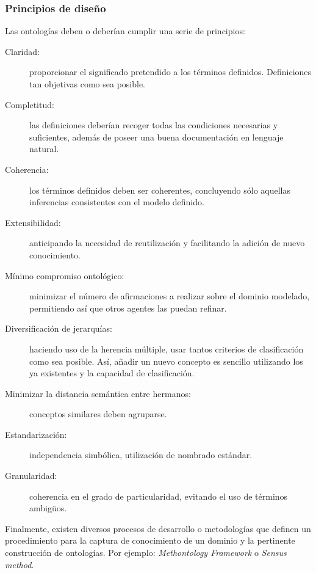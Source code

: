 \subsubsection{Principios de diseño}\label{onto-design}
Las ontologías deben o deberían cumplir una serie de principios:
\begin{description}
\item[Claridad:] proporcionar el significado pretendido a los términos
definidos. Definiciones tan objetivas como sea posible.
\item[Completitud:] las definiciones deberían recoger todas las condiciones
necesarias y suficientes, además de poseer una buena documentación en lenguaje natural.
 \item[Coherencia:] los términos definidos deben ser coherentes, concluyendo
 sólo aquellas inferencias consistentes con el modelo definido.
 \item[Extensibilidad:] anticipando la necesidad de reutilización y facilitando
 la adición de nuevo \linebreak conocimiento.
 \item[Mínimo compromiso ontológico:] minimizar el número de afirmaciones a
 realizar sobre el dominio modelado, permitiendo así que otros agentes las
 puedan refinar.

\item[Diversificación de jerarquías:] haciendo uso de la herencia múltiple, usar
tantos criterios de clasificación como sea posible. Así, añadir un nuevo concepto
es sencillo utilizando los ya existentes y la capacidad de clasificación.

\item[Minimizar la distancia semántica entre hermanos:] conceptos similares
deben agruparse.
 
  \item[Estandarización:] independencia simbólica, utilización de nombrado estándar.
 \item[Granularidad:] coherencia en el grado de particularidad, evitando el uso
 de términos ambig\"{u}os.
\end{description}

Finalmente, existen diversos procesos de desarrollo o metodologías que definen un
procedimiento para la captura de conocimiento de un dominio y la pertinente
construcción de ontologías. Por ejemplo: \textit{Methontology Framework} o \textit{Sensus method}. 


